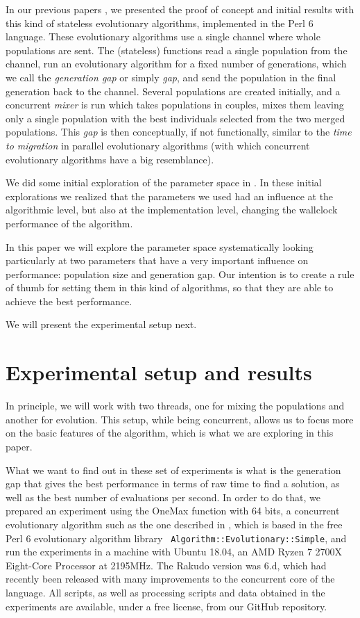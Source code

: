 \documentclass[sigconf]{acmart}
\begin{document}
In our previous papers 
\cite{Merelo:2018:MEA:3205651.3208317:anon,Garcia-Valdez:2018:MEA:3205651.3205719:anon},
we presented the proof of concept and initial results with this kind
of stateless evolutionary algorithms, implemented in the Perl 6
language. These evolutionary algorithms use a single channel where
whole populations are sent. The (stateless) functions read a single
population from the channel, run an evolutionary algorithm for a fixed
number of generations, which we call the {\em generation gap} or
simply {\em gap}, and send the population in the final generation back
to the channel. Several populations are created initially, and a
concurrent {\em mixer} is run which takes populations in couples,
mixes them leaving only a single population with the best individuals
selected from the two merged populations.
 This {\em
  gap} is then conceptually, if not functionally, similar to the {\em
  time to migration} in parallel evolutionary algorithms (with which
concurrent evolutionary algorithms have a big resemblance).

We did some initial exploration of the parameter space in
\cite{merelo:WEA:anon}. In these initial explorations we realized
that the parameters we used had an influence at the algorithmic level,
but also at the implementation level, changing the wallclock
performance of the algorithm.

In this paper we will explore the parameter space systematically
looking particularly at two parameters that have a very important
influence on performance: population size and generation gap. Our
intention is to create a rule of thumb for setting them in this kind
of algorithms, so that they are able to achieve the best
performance. 

We will present the experimental setup next.

\section{Experimental setup and results}
\label{sec:res}
In principle, we will work with two threads, one for
mixing the populations and another for evolution. This setup, while
being concurrent, allows us to focus more on the basic features of the
algorithm, which is what we are exploring in this paper. 

What we want to find out in these set of experiments is what is the
generation gap that gives the best performance in terms of raw time to
find a solution, as well as the best number of evaluations per
second. In order to do that, we prepared an experiment using the
OneMax function with 64 bits, a concurrent evolutionary algorithm such
as the one described in \cite{Merelo:2018:MEA:3205651.3208317:anon},
which is based in the free Perl 6 evolutionary algorithm library {\tt
  Algorithm::Evolutionary::Simple}, and run the experiments in a
machine with Ubuntu 18.04, an AMD Ryzen 7 2700X Eight-Core Processor
at 2195MHz. The Rakudo version was 6.d, which had recently been
released with many improvements to the concurrent core of the
language. All scripts, as well as processing scripts and data obtained
in the experiments are available, under a free license, from our GitHub
repository.
\end{document}
